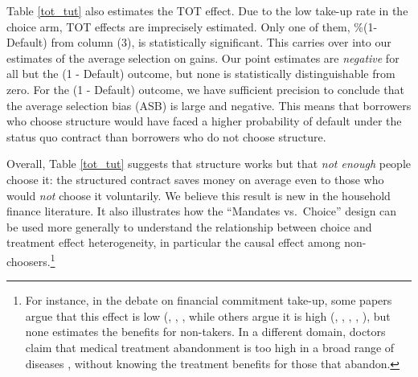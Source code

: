 \documentclass[12pt, a4paper, colorinlistoftodos]{article}
\begin{document}
Table \ref{tot_tut} also estimates the TOT effect. Due to the low take-up rate in the choice arm, TOT effects are imprecisely estimated. Only one of them, \%(1-Default) from column (3), is statistically significant. 
This carries over into our estimates of the average selection on gains. Our point estimates are \emph{negative} for all but the (1 - Default) outcome, but none is statistically distinguishable from zero.  
For the (1 - Default) outcome, we have sufficient precision to conclude that the average selection bias (ASB) is large and negative.
This means that borrowers who choose structure would have faced a higher probability of default under the status quo contract than borrowers who do not choose structure.%


Overall, Table \ref{tot_tut} suggests that structure works but that \emph{not enough} people choose it: the structured contract saves money on average even to those who would \emph{not} choose it voluntarily. We believe this result is new in the household finance literature. It also illustrates how the ``Mandates vs.\ Choice'' design can be used more generally to understand the relationship between choice and treatment effect heterogeneity, in particular the causal effect among non-choosers.\footnote{For instance, in the debate on financial commitment take-up, some papers argue that this effect is low (\cite{Ashraf}, \cite{Gine}, \cite{Ted}, \cite{Royer} while others argue it is high (\cite{Kremer}, \cite{Casaburi}, \cite{Alcohol}, \cite{AprajitP&P}, \cite{Pascaline}), but none estimates the benefits for non-takers. In a different domain, doctors claim that medical treatment abandonment is too high in a broad range of diseases \citep{non_adherence}, without knowing the treatment benefits for those that abandon.}
\end{document}
